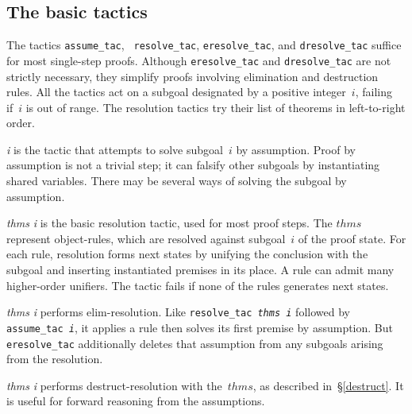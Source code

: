 \subsection{The basic tactics}
The tactics {\tt assume_tac}, {\tt
resolve_tac}, {\tt eresolve_tac}, and {\tt dresolve_tac} suffice for most
single-step proofs.  Although {\tt eresolve_tac} and {\tt dresolve_tac} are
not strictly necessary, they simplify proofs involving elimination and
destruction rules.  All the tactics act on a subgoal designated by a
positive integer~$i$, failing if~$i$ is out of range.  The resolution
tactics try their list of theorems in left-to-right order.

\begin{ttdescription}
\item[\ttindex{assume_tac} {\it i}] 
  is the tactic that attempts to solve subgoal~$i$ by assumption.  Proof by
  assumption is not a trivial step; it can falsify other subgoals by
  instantiating shared variables.  There may be several ways of solving the
  subgoal by assumption.

\item[\ttindex{resolve_tac} {\it thms} {\it i}]
  is the basic resolution tactic, used for most proof steps.  The $thms$
  represent object-rules, which are resolved against subgoal~$i$ of the
  proof state.  For each rule, resolution forms next states by unifying the
  conclusion with the subgoal and inserting instantiated premises in its
  place.  A rule can admit many higher-order unifiers.  The tactic fails if
  none of the rules generates next states.

\item[\ttindex{eresolve_tac} {\it thms} {\it i}] 
  performs elim-resolution.  Like {\tt resolve_tac~{\it thms}~{\it i\/}}
  followed by {\tt assume_tac~{\it i}}, it applies a rule then solves its
  first premise by assumption.  But {\tt eresolve_tac} additionally deletes
  that assumption from any subgoals arising from the resolution.

\item[\ttindex{dresolve_tac} {\it thms} {\it i}]
  performs destruct-resolution with the~$thms$, as described
  in~\S\ref{destruct}.  It is useful for forward reasoning from the
  assumptions.
\end{ttdescription}

